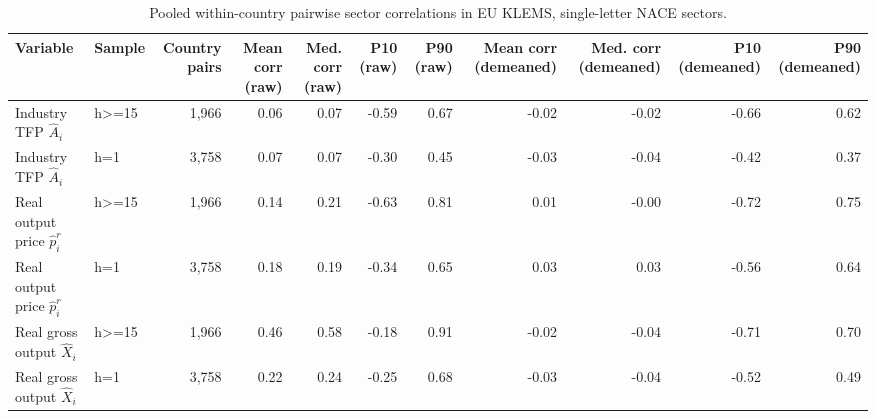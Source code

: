 \begin{table}[t]
\centering
\small
\caption{Pooled within-country pairwise sector correlations in EU KLEMS, single-letter NACE sectors.}
\label{tab_within_country_pairwise_summary}
\begin{tabular}{llrrrrrrrrr}
\toprule
Variable & Sample & Country pairs & Mean corr (raw) & Med. corr (raw) & P10 (raw) & P90 (raw) & Mean corr (demeaned) & Med. corr (demeaned) & P10 (demeaned) & P90 (demeaned)
\\
\midrule
Industry TFP $\hat A_i$ & h>=15 & 1,966 & 0.06 & 0.07 & -0.59 & 0.67 & -0.02 & -0.02 & -0.66 & 0.62
\\
Industry TFP $\hat A_i$ & h=1 & 3,758 & 0.07 & 0.07 & -0.30 & 0.45 & -0.03 & -0.04 & -0.42 & 0.37
\\
Real output price $\hat p^r_i$ & h>=15 & 1,966 & 0.14 & 0.21 & -0.63 & 0.81 & 0.01 & -0.00 & -0.72 & 0.75
\\
Real output price $\hat p^r_i$ & h=1 & 3,758 & 0.18 & 0.19 & -0.34 & 0.65 & 0.03 & 0.03 & -0.56 & 0.64
\\
Real gross output $\hat X_i$ & h>=15 & 1,966 & 0.46 & 0.58 & -0.18 & 0.91 & -0.02 & -0.04 & -0.71 & 0.70
\\
Real gross output $\hat X_i$ & h=1 & 3,758 & 0.22 & 0.24 & -0.25 & 0.68 & -0.03 & -0.04 & -0.52 & 0.49
\\
\bottomrule
\end{tabular}
\end{table}
